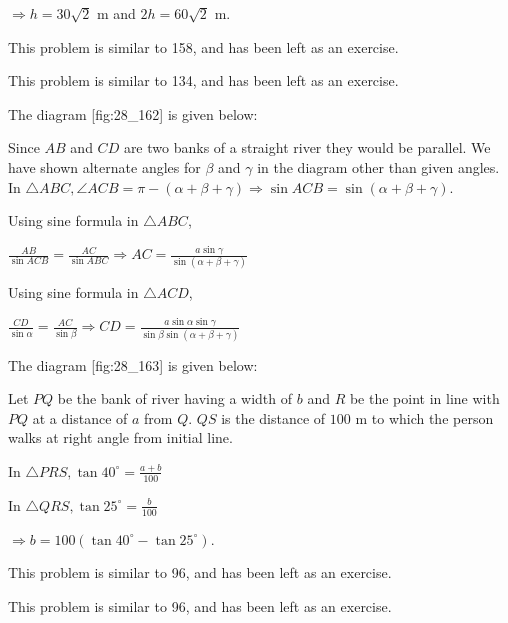   $\Rightarrow h = 30\sqrt{2}$ m and $2h = 60\sqrt{2}$ m.

\item This problem is similar to 158, and has been left as an exercise.

\item This problem is similar to 134, and has been left as an exercise.

\item The diagram [fig:28_162] is given below:

  \startplacefigure[reference=fig:28_162]
    \externalfigure[28_162.pdf]
  \stopplacefigure

  Since $AB$ and $CD$ are two banks of a straight river they would be parallel. We have shown
  alternate angles for $\beta$ and $\gamma$ in the diagram other than given angles. In
  $\triangle ABC, \angle ACB = \pi - (\alpha + \beta + \gamma) \Rightarrow \sin ACB = \sin(\alpha +
  \beta + \gamma)$.

  Using sine formula in $\triangle ABC$,

  $\frac{AB}{\sin ACB} = \frac{AC}{\sin ABC} \Rightarrow AC = \frac{a\sin\gamma}{\sin(\alpha +
    \beta + \gamma)}$

  Using sine formula in $\triangle ACD$,

  $\frac{CD}{\sin\alpha} = \frac{AC}{\sin\beta} \Rightarrow CD =
  \frac{a\sin\alpha\sin\gamma}{\sin\beta\sin(\alpha + \beta + \gamma)}$

\item The diagram [fig:28_163] is given below:

  \startplacefigure[reference=fig:28_163]
    \externalfigure[28_163.pdf]
  \stopplacefigure

  Let $PQ$ be the bank of river having a width of $b$ and $R$ be the point in line with
  $PQ$ at a distance of $a$ from $Q$. $QS$ is the distance of $100$ m to
  which the person walks at right angle from initial line.

  In $\triangle PRS, \tan40^\circ = \frac{a + b}{100}$

  In $\triangle QRS, \tan25^\circ = \frac{b}{100}$

  $\Rightarrow b = 100(\tan40^\circ - \tan25^\circ)$.

\item This problem is similar to 96, and has been left as an exercise.

\item This problem is similar to 96, and has been left as an exercise.

